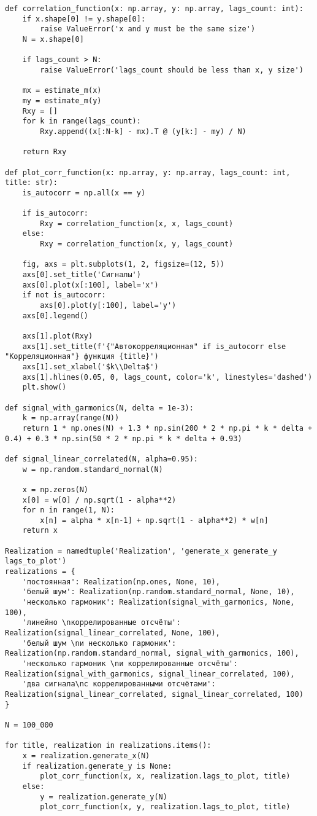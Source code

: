 {
	\vspace{-1.5em}
	\label{corr_plot_prog}
	\begin{verbatim}
def correlation_function(x: np.array, y: np.array, lags_count: int):
	if x.shape[0] != y.shape[0]:
		raise ValueError('x and y must be the same size')
	N = x.shape[0]
	
	if lags_count > N:
		raise ValueError('lags_count should be less than x, y size')
	
	mx = estimate_m(x)
	my = estimate_m(y)
	Rxy = []
	for k in range(lags_count):
		Rxy.append((x[:N-k] - mx).T @ (y[k:] - my) / N)
	
	return Rxy

def plot_corr_function(x: np.array, y: np.array, lags_count: int, title: str):
	is_autocorr = np.all(x == y)
	
	if is_autocorr:
		Rxy = correlation_function(x, x, lags_count)
	else:
		Rxy = correlation_function(x, y, lags_count)
	
	fig, axs = plt.subplots(1, 2, figsize=(12, 5))
	axs[0].set_title('Сигналы')
	axs[0].plot(x[:100], label='x')
	if not is_autocorr:
		axs[0].plot(y[:100], label='y')
	axs[0].legend()
	
	axs[1].plot(Rxy)
	axs[1].set_title(f'{"Автокорреляционная" if is_autocorr else "Корреляционная"} функция {title}')
	axs[1].set_xlabel('$k\\Delta$')
	axs[1].hlines(0.05, 0, lags_count, color='k', linestyles='dashed')
	plt.show()

def signal_with_garmonics(N, delta = 1e-3):
	k = np.array(range(N))
	return 1 * np.ones(N) + 1.3 * np.sin(200 * 2 * np.pi * k * delta + 0.4) + 0.3 * np.sin(50 * 2 * np.pi * k * delta + 0.93)

def signal_linear_correlated(N, alpha=0.95):
	w = np.random.standard_normal(N)

	x = np.zeros(N)
	x[0] = w[0] / np.sqrt(1 - alpha**2)
	for n in range(1, N):
		x[n] = alpha * x[n-1] + np.sqrt(1 - alpha**2) * w[n]
	return x
	
Realization = namedtuple('Realization', 'generate_x generate_y lags_to_plot')
realizations = {
	'постоянная': Realization(np.ones, None, 10),
	'белый шум': Realization(np.random.standard_normal, None, 10),
	'несколько гармоник': Realization(signal_with_garmonics, None, 100),
	'линейно \nкоррелированные отсчёты': Realization(signal_linear_correlated, None, 100),
	'белый шум \nи несколько гармоник': Realization(np.random.standard_normal, signal_with_garmonics, 100),
	'несколько гармоник \nи коррелированные отсчёты': Realization(signal_with_garmonics, signal_linear_correlated, 100),
	'два сигнала\nс коррелированными отсчётами': Realization(signal_linear_correlated, signal_linear_correlated, 100)
}

N = 100_000

for title, realization in realizations.items():
	x = realization.generate_x(N)
	if realization.generate_y is None:
		plot_corr_function(x, x, realization.lags_to_plot, title)
	else:
		y = realization.generate_y(N)
		plot_corr_function(x, y, realization.lags_to_plot, title)
	\end{verbatim}
}

